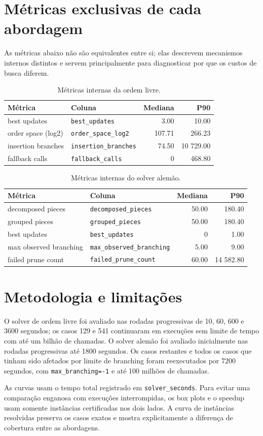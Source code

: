 \documentclass[10pt,a4paper]{article}
\begin{document}
\section{Métricas exclusivas de cada abordagem}

As métricas abaixo não são equivalentes entre si; elas descrevem mecanismos
internos distintos e servem principalmente para diagnosticar por que os custos
de busca diferem.

\begin{table}[H]
\centering
\caption{Métricas internas da ordem livre.}
\begin{tabular}{@{}llrr@{}}
\toprule
Métrica & Coluna & Mediana & P90 \\
\midrule
best updates & \texttt{best\_updates} & 3.00 & 10.00 \\
order space (log2) & \texttt{order\_space\_log2} & 107.71 & 266.23 \\
insertion branches & \texttt{insertion\_branches} & 74.50 & 10 729.00 \\
fallback calls & \texttt{fallback\_calls} & 0 & 468.80 \\
\bottomrule
\end{tabular}
\end{table}

\begin{table}[H]
\centering
\caption{Métricas internas do solver alemão.}
\begin{tabular}{@{}llrr@{}}
\toprule
Métrica & Coluna & Mediana & P90 \\
\midrule
decomposed pieces & \texttt{decomposed\_pieces} & 50.00 & 180.40 \\
grouped pieces & \texttt{grouped\_pieces} & 50.00 & 180.40 \\
best updates & \texttt{best\_updates} & 0 & 1.00 \\
max observed branching & \texttt{max\_observed\_branching} & 5.00 & 9.00 \\
failed prune count & \texttt{failed\_prune\_count} & 60.00 & 14 582.80 \\
\bottomrule
\end{tabular}
\end{table}

\section{Metodologia e limitações}

O solver de ordem livre foi avaliado nas rodadas progressivas de 10, 60, 600 e
3600 segundos; os casos 129 e 541 continuaram em execuções sem limite de tempo
com até um bilhão de chamadas. O solver alemão foi avaliado inicialmente nas
rodadas progressivas até 1800 segundos. Os casos restantes e todos os casos que
tinham sido afetados por limite de branching foram reexecutados por 7200
segundos, com \texttt{max\_branching=-1} e até 100 milhões de chamadas.

As curvas usam o tempo total registrado em \texttt{solver\_seconds}. Para evitar uma
comparação enganosa com execuções interrompidas, os box plots e o speedup usam
somente instâncias certificadas nos dois lados. A curva de instâncias
resolvidas preserva os casos exatos e mostra explicitamente a diferença de
cobertura entre as abordagens.
\end{document}
